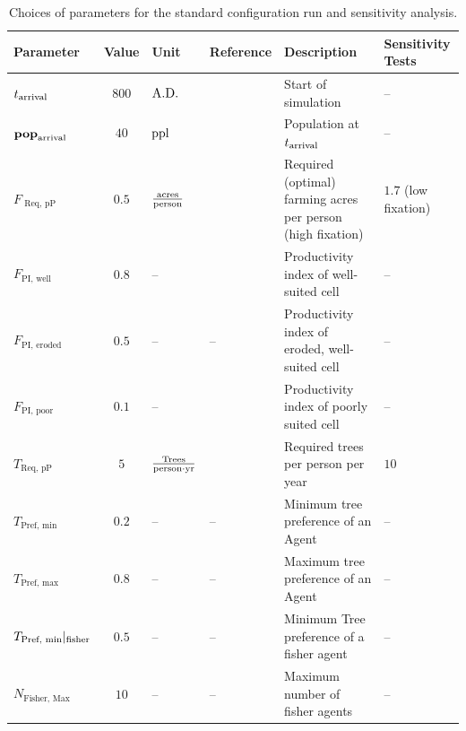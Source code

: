 \begin{table}
	  	  	\caption{Choices of parameters for the standard configuration run and sensitivity analysis. %
	}
	\begin{tabular}{P|S|H|Q|M|P}
		Parameter & Value & Unit & Reference & Description & Sensitivity Tests \\ \hline
		$t_{\rm arrival}$ & $800$ &${\rm A.D.}$& \citet{Bahn2017} & Start of simulation & --\\
		$\mathbf{pop}_{\rm arrival}$ & $40$ & ${\rm ppl}$ & \citet{Brander1998} & Population at $t_{\rm arrival}$ & --\\ \hline
		 $F_\text{ Req, pP}$ & $0.5$ & ${\rm \frac{acres}{person}}$ & \citet{Puleston2017} & Required (optimal) farming acres per person (high fixation) & $1.7$ (low fixation) \\
		 $F_\text{PI, well}$ & $0.8$ & -- & \citet{Louwagie2006} & Productivity index of well-suited cell & -- \\
		 $F_\text{PI, eroded}$ & $0.5$ & -- & -- & Productivity index of eroded, well-suited cell & --\\
		 $F_\text{PI, poor}$ & $0.1$ & -- & \citet{Louwagie2006} & Productivity index of poorly suited cell & -- \\ 
		 $T_\text{Req, pP}$ & $5$ & $ {\rm \frac{Trees}{person \cdot yr}}$ & \citet{Brandt2015} & Required trees per person per year & $10$  \\
		  $T_\text{Pref, min}$ & $0.2$ & --&-- & Minimum tree preference of an Agent&  -- \\ 
		  $T_\text{Pref, max}$ & $0.8$ & --&-- & Maximum tree preference of an Agent&  -- \\
		  $T_\text{Pref, min}|_{\rm fisher}$ & $0.5$ & --&-- & Minimum Tree preference of a fisher agent&  -- \\
		  $N_\text{Fisher, Max}$ & $10$ & --&-- & Maximum number of fisher agents &  -- \\ \hline
		  

\end{tabular}
\end{table}

